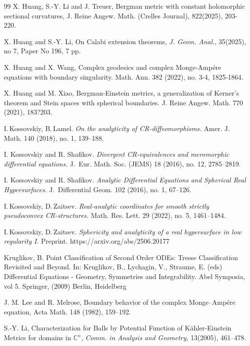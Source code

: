 \documentclass[12pt]{amsart}
\def\CC{\mathbb{C}}
\begin{document}
{{\begin{thebibliography}{99}
  X. Huang, S.-Y. Li and J. Treuer, Bergman metric with constant holomorphic sectional curvatures, J. Reine Angew. Math. (Crelles Journal), 822(2025), 203-220.


 X. Huang and S.-Y. Li, On Calabi extension theorems, {\it J. Geom. Anal.}, 35(2025), no 7, Paper No 196, 7 pp.

 X. Huang and X. Wang, 
Complex geodesics and complex Monge-Amp\'ere equations with boundary singularity.
Math. Ann. 382 (2022), no. 3-4, 1825-1864.

 X. Huang and M. Xiao, 
Bergman-Einstein metrics, a generalization of Kerner's theorem and Stein spaces with spherical boundaries.
J. Reine Angew. Math. 770 (2021), 183?203. 

 I.\,Kossovskiy,  B.\,Lamel. {\it On the analyticity of CR-diffeomorphisms.} Amer. J. Math. 140 (2018), no. 1, 139--188.

 I. Kossovskiy and R. Shafikov. 
{\it Divergent CR-equivalences and meromorphic differential
equations.} J.~Eur. Math. Soc. (JEMS) 18 (2016), no. 12, 2785--2819.

 I. Kossovskiy and R. Shafikov. {\it Analytic
Differential Equations and  Spherical Real Hypersurfaces.} J.~Differential Geom. 102 (2016), no. 1, 67--126.

 I.\,Kossovskiy, D.\,Zaitsev. {\it Real-analytic coordinates for smooth strictly pseudoconvex CR-structures.} Math. Res. Lett. 29 (2022), no. 5, 1461–1484.

 I.\,Kossovskiy, D.\,Zaitsev. {\it Sphericity and analyticity of a real hypersurface in low regularity I.} Preprint. https://arxiv.org/abs/2506.20177

 Kruglikov, B.  Point Classification of Second Order ODEs: Tresse Classification Revisited and Beyond. In: Kruglikov, B., Lychagin, V., Straume, E. (eds) Differential Equations - Geometry, Symmetries and Integrability. Abel Symposia, vol 5. Springer, (2009) Berlin, Heidelberg


 J. M. Lee and R. Melrose,
Boundary behavior of the complex Monge--Amp\'ere equation,
Acta Math. 148 (1982), 159--192.

 S.-Y. Li, Characterization for Balls  by Potential Function of  K\"ahler-Einstein Metrics 
for domains in  $\CC^n$, {\it Comm. in Analysis and Geometry,}  13(2005), 461--478.


\end{thebibliography}}}
\end{document}
